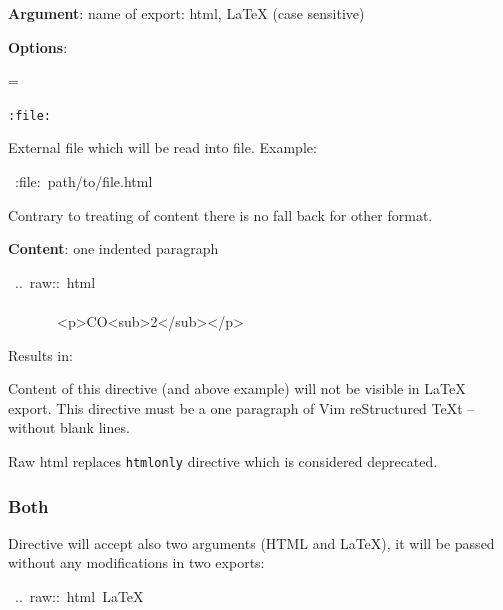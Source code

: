 \documentclass[12pt]{article}
\newenvironment{deflist}[1]{%
\begin{list}{}
{\renewcommand{\makelabel}[1]{\textbf{##1}\hfill}
\settowidth{\labelwidth}{\textbf{#1}}
\leftmargin=\labelwidth
\advance \leftmargin\labelsep}}
{\end{list}}
\begin{document}
\begin{itemize}
\item
\textbf{Argument}: name of export: html, \LaTeX{} (case sensitive)

\item
\textbf{Options}:

 \begin{deflist}{iii}

\item[ \texttt{:file:}]

External file which will be read into file. Example:

\begin{ttfamily}\begin{flushleft}
\mbox{~:file:~path/to/file.html}\\
\end{flushleft}\end{ttfamily}

 Contrary to treating of content there is no fall back for other
 format.
\end{deflist}

\item
\textbf{Content}: one indented paragraph
\end{itemize}

\begin{ttfamily}\begin{flushleft}
\mbox{~..~raw::~html}\\
\mbox{}\\
\mbox{~~~~~~~<p>CO<sub>2</sub></p>}\\
\end{flushleft}\end{ttfamily}

Results in:

Content of this directive (and above example) will not be visible in \LaTeX{}
export. This directive must be a one paragraph of Vim reStructured \TeX{}t -- without blank lines.

Raw html replaces \texttt{htmlonly} directive which is considered deprecated.

\hypertarget{lboth}{}
\subsubsection{Both}

Directive will accept also two arguments (HTML and \LaTeX{}), it will be passed
without any modifications in two exports:

\begin{ttfamily}\begin{flushleft}
\mbox{~..~raw::~html~\LaTeX{}}\\
\end{flushleft}\end{ttfamily}
\end{document}
